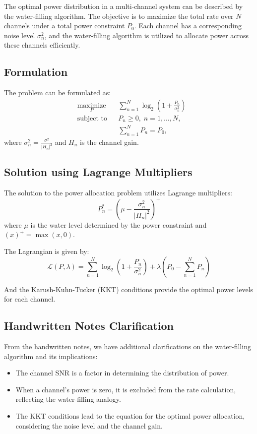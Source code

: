 The optimal power distribution in a multi-channel system can be described by the water-filling algorithm. The objective is to maximize the total rate over $N$ channels under a total power constraint $P_0$. Each channel has a corresponding noise level $\sigma_n^2$, and the water-filling algorithm is utilized to allocate power across these channels efficiently.

\subsection*{Formulation}
The problem can be formulated as:
\begin{equation}
\begin{aligned}
& \underset{P}{\text{maximize}}
& & \sum_{n=1}^{N} \log_2 \left(1 + \frac{P_n}{\sigma_n^2}\right) \\
& \text{subject to}
& & P_n \geq 0, \; n = 1, \ldots, N, \\
&&& \sum_{n=1}^{N} P_n = P_0,
\end{aligned}
\end{equation}
where $\sigma_n^2 = \frac{\sigma^2}{|H_n|^2}$ and $H_n$ is the channel gain.

\subsection*{Solution using Lagrange Multipliers}
The solution to the power allocation problem utilizes Lagrange multipliers:
\begin{equation}
P_n^* = \left(\mu - \frac{\sigma_n^2}{|H_n|^2}\right)^+
\end{equation}
where $\mu$ is the water level determined by the power constraint and $(x)^+ = \max(x, 0)$.

The Lagrangian is given by:
\begin{equation}
\mathcal{L}(P, \lambda) = \sum_{n=1}^{N} \log_2 \left(1 + \frac{P_n}{\sigma_n^2}\right) + \lambda \left(P_0 - \sum_{n=1}^{N} P_n\right)
\end{equation}

And the Karush-Kuhn-Tucker (KKT) conditions provide the optimal power levels for each channel.

\subsection*{Handwritten Notes Clarification}
From the handwritten notes, we have additional clarifications on the water-filling algorithm and its implications:
\begin{itemize}
    \item The channel SNR is a factor in determining the distribution of power.
    \item When a channel's power is zero, it is excluded from the rate calculation, reflecting the water-filling analogy.
    \item The KKT conditions lead to the equation for the optimal power allocation, considering the noise level and the channel gain.
\end{itemize}





